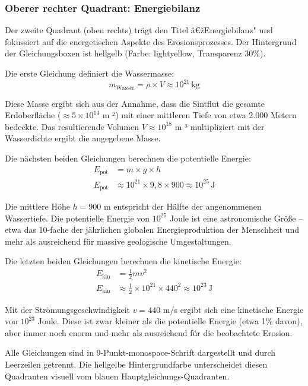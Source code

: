 \subsubsection*{Oberer rechter Quadrant: Energiebilanz}

Der zweite Quadrant (oben rechts) trägt den Titel â€žEnergiebilanz" und fokussiert auf die energetischen Aspekte des Erosionsprozesses. Der Hintergrund der Gleichungsboxen ist hellgelb (Farbe: lightyellow, Transparenz 30\%).

Die erste Gleichung definiert die Wassermasse:
\begin{equation*}
m_{\mathrm{Wasser}} = \rho \times V \approx 10^{21} \, \mathrm{kg}
\end{equation*}

Diese Masse ergibt sich aus der Annahme, dass die Sintflut die gesamte Erdoberfläche ($\approx 5 \times 10^{14}$ m ²) mit einer mittleren Tiefe von etwa 2.000 Metern bedeckte. Das resultierende Volumen $V \approx 10^{18}$ m ³ multipliziert mit der Wasserdichte ergibt die angegebene Masse.

Die nächsten beiden Gleichungen berechnen die potentielle Energie:
\begin{align*}
E_{\mathrm{pot}} &= m \times g \times h \\
E_{\mathrm{pot}} &\approx 10^{21} \times 9{,}8 \times 900 \approx 10^{25} \, \mathrm{J}
\end{align*}

Die mittlere Höhe $h = 900$ m entspricht der Hälfte der angenommenen Wassertiefe. Die potentielle Energie von $10^{25}$ Joule ist eine astronomische Größe -- etwa das 10-fache der jährlichen globalen Energieproduktion der Menschheit und mehr als ausreichend für massive geologische Umgestaltungen.

Die letzten beiden Gleichungen berechnen die kinetische Energie:
\begin{align*}
E_{\mathrm{kin}} &= \frac{1}{2} m v^2 \\
E_{\mathrm{kin}} &\approx \frac{1}{2} \times 10^{21} \times 440^2 \approx 10^{23} \, \mathrm{J}
\end{align*}

Mit der Strömungsgeschwindigkeit $v = 440$ m/s ergibt sich eine kinetische Energie von $10^{23}$ Joule. Diese ist zwar kleiner als die potentielle Energie (etwa 1\% davon), aber immer noch enorm und mehr als ausreichend für die beobachtete Erosion.

Alle Gleichungen sind in 9-Punkt-monospace-Schrift dargestellt und durch Leerzeilen getrennt. Die hellgelbe Hintergrundfarbe unterscheidet diesen Quadranten visuell vom blauen Hauptgleichungs-Quadranten.

